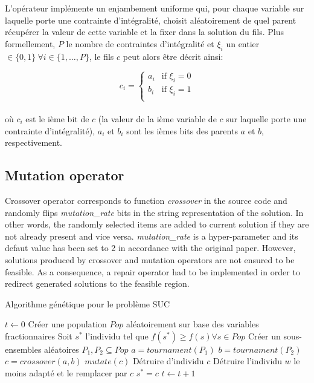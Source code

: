L'opérateur implémente un enjambement uniforme qui, pour chaque variable sur laquelle
porte une contrainte d'intégralité, choisit aléatoirement de quel parent récupérer
la valeur de cette variable et la fixer dans la solution du fils.
Plus formellement, $P$ le nombre de contraintes d'intégralité et $\xi_i$ un entier
$\in \{0, 1\} \ \forall i \in \{1, \ldots, P\}$, le fils $c$ peut alors être décrit ainsi:

\begin{equation}
  c_i =
    \begin{cases}
      a_i & \text{if } \xi_i = 0 \\
      b_i & \text{if } \xi_i = 1 \\
    \end{cases}       
\end{equation} \\

où $c_i$ est le ième bit de $c$ (la valeur de la ième variable de $c$ sur laquelle porte une
contrainte d'intégralité),
$a_i$ et $b_i$ sont les ièmes bits des parents $a$ et $b$, respectivement.

\subsection{Mutation operator}

Crossover operator corresponds to function \textit{crossover} in the source code and randomly
flips \textit{mutation\_rate} bits in the string representation of the solution.
In other words, the randomly selected items are added to current solution if they are not already
present and vice versa.
\textit{mutation\_rate} is a hyper-parameter and its defaut value has been set to 2 in accordance
with the original paper. However, solutions produced by crossover and mutation operators are
not ensured to be feasible. As a consequence, a repair operator had to be implemented in order
to redirect generated solutions to the feasible region.

\begin{algorithm}[H]
\caption{Algorithme génétique pour le problème SUC}
\begin{algorithmic}[1]
\State $t \leftarrow 0$
\State Créer une population $Pop$ aléatoirement sur base des variables fractionnaires
\State Soit $s^{*}$ l'individu tel que $f(s^{*}) \ge f(s) \forall s \in Pop$
\State Créer un sous-ensembles aléatoires $P_1, P_2 \subseteq Pop$
\State $a = tournament(P_1)$
\State $b = tournament(P_2)$
\State $c = crossover(a, b)$
\State $mutate(c)$
\State Détruire d'individu $c$
\Else
\State Détruire l'individu $w$ le moins adapté et le remplacer par $c$
\EndIf
{}
\State $s^{*} = c$
\EndIf
\State $t \leftarrow t + 1$
\EndWhile
\EndProcedure
\end{algorithmic}
\end{algorithm}

